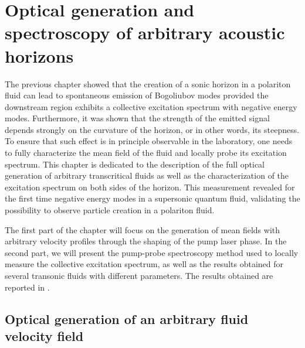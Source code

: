 

\setcounter{topnumber}{2}
\setcounter{bottomnumber}{0}
\setcounter{totalnumber}{2}
\renewcommand{\topfraction}{0.99}
\renewcommand{\textfraction}{0.01}
\renewcommand{\floatpagefraction}{0.8}

\graphicspath{{./}{./fig/}{./chap_custom_st/fig/}}

\chapter{Optical generation and spectroscopy of arbitrary acoustic horizons}

\label{chap:generation_transonic_fluid}


The previous chapter showed that the creation of a sonic horizon in a polariton fluid can lead to spontaneous emission of Bogoliubov modes provided the downstream region exhibits a collective excitation spectrum with
negative energy modes. Furthermore, it was shown that the strength of the emitted signal depends strongly on the curvature of the horizon, or in other words, its steepness. To ensure that such effect is in principle observable in the laboratory, one needs to fully characterize the mean field of the fluid and locally probe its excitation spectrum. This chapter is dedicated to the description of the full optical generation of arbitrary transcritical fluids as well as the characterization of the excitation spectrum on both sides of the horizon. 
This measurement revealed for the first time negative energy modes in a supersonic quantum fluid, validating the possibility to observe particle creation in a polariton fluid.

The first part of the chapter will focus on the generation of mean fields with arbitrary velocity profiles through the shaping of the pump laser phase. In the second part, we will present the pump-probe spectroscopy method used to locally measure the collective excitation spectrum, as well
as the results obtained for several transonic fluids with different parameters. The results obtained are reported in \cite{falque2024polaritonfluidsquantumfield}.

\section{Optical generation of an arbitrary fluid velocity field}


